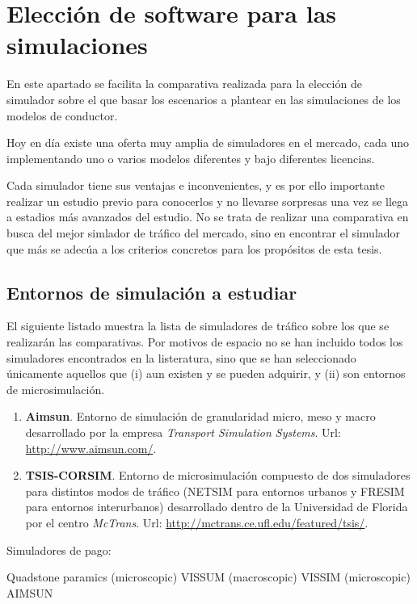 \section{Elección de software para las simulaciones}

En este apartado se facilita la comparativa realizada para la elección de simulador sobre el que basar los escenarios a plantear en las simulaciones de los modelos de conductor.

Hoy en día existe una oferta muy amplia de simuladores en el mercado, cada uno implementando uno o varios modelos diferentes y bajo diferentes licencias.

Cada simulador tiene sus ventajas e inconvenientes, y es por ello importante realizar un estudio previo para conocerlos y no llevarse sorpresas una vez se llega a estadios más avanzados del estudio. No se trata de realizar una comparativa en busca del mejor simlador de tráfico del mercado, sino en encontrar el simulador que más se adecúa a los criterios concretos para los propósitos de esta tesis.

\subsection{Entornos de simulación a estudiar}

El siguiente listado muestra la lista de simuladores de tráfico sobre los que se realizarán las comparativas. Por motivos de espacio no se han incluido todos los simuladores encontrados en la listeratura, sino que se han seleccionado únicamente aquellos que (i) aun existen y se pueden adquirir, y (ii) son entornos de microsimulación.

\begin{enumerate}
	\item \textbf{Aimsun}. Entorno de simulación de granularidad micro, meso y macro desarrollado por la empresa \textit{Transport Simulation Systems}. Url: \url{http://www.aimsun.com/}.
	\item \textbf{TSIS-CORSIM}. Entorno de microsimulación compuesto de dos simuladores para distintos modos de tráfico (NETSIM para entornos urbanos y FRESIM para entornos interurbanos) desarrollado dentro de la Universidad de Florida por el centro \textit{McTrans}. Url: \url{http://mctrans.ce.ufl.edu/featured/tsis/}.
\end{enumerate}

Simuladores de pago:

Quadstone paramics (microscopic)
VISSUM (macroscopic)
VISSIM (microscopic)
AIMSUN

